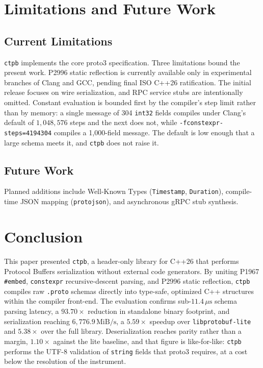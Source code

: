 \section{Limitations and Future Work}

\subsection{Current Limitations}
\texttt{ctpb} implements the core proto3 specification. Three limitations bound the present work. P2996 static reflection is currently available only in experimental branches of Clang and GCC, pending final ISO C++26 ratification. The initial release focuses on wire serialization, and RPC service stubs are intentionally omitted. Constant evaluation is bounded first by the compiler's step limit rather than by memory: a single message of 304 \texttt{int32} fields compiles under Clang's default of $1{,}048{,}576$ steps and the next does not, while \texttt{-fconstexpr-steps=4194304} compiles a 1{,}000-field message. The default is low enough that a large schema meets it, and \texttt{ctpb} does not raise it.

\subsection{Future Work}
Planned additions include Well-Known Types (\texttt{Timestamp}, \texttt{Duration}), compile-time JSON mapping (\texttt{protojson}), and asynchronous gRPC stub synthesis.

\section{Conclusion}
This paper presented \texttt{ctpb}, a header-only library for C++26 that performs Protocol Buffers serialization without external code generators. By uniting P1967 \texttt{\#embed}, \texttt{constexpr} recursive-descent parsing, and P2996 static reflection, \texttt{ctpb} compiles raw \texttt{.proto} schemas directly into type-safe, optimized C++ structures within the compiler front-end. The evaluation confirms sub-$11.4\,\mu\text{s}$ schema parsing latency, a $93.70\times$ reduction in standalone binary footprint, and serialization reaching $6{,}776.9\,\text{MiB/s}$, a $5.59\times$ speedup over \texttt{libprotobuf-lite} and $5.38\times$ over the full library. Deserialization reaches parity rather than a margin, $1.10\times$ against the lite baseline, and that figure is like-for-like: \texttt{ctpb} performs the UTF-8 validation of \texttt{string} fields that proto3 requires, at a cost below the resolution of the instrument.

